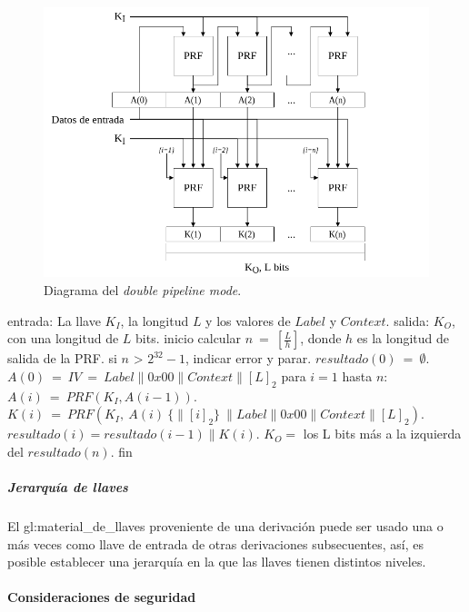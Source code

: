 \begin{figure}[H]
  \begin{center}
    \includegraphics[width=0.75\linewidth]{diagramas/dpipeline_mode}
    \caption{Diagrama del \textit{double pipeline mode}.}
    \label{diagrama_dpipeline_mode}
   \end{center}
\end{figure}

\begin{pseudocodigo}[caption={Funcionamiento del \textit{double pipeline mode}.}, 
label={mi:3}]
  entrada:   La llave $K_I$, la longitud $L$ y los valores de $Label$ y $Context$.
  salida:    $K_O$, con una longitud de $L$ bits.
  inicio
    calcular $n\: =\: [\frac{L}{h}]$, donde $h$ es la longitud de salida de la PRF.
    si $n$ > $2^{32}-1$, indicar error y parar.
    $resultado(0)\: =\: \emptyset$.
    $A(0)\: =\: IV\: =\: Label \parallel 0x00 \parallel Context \parallel {[L]}_2$
    para $i=1$ hasta $n$:
      $A(i)\: =\: PRF(K_I, A(i-1))$.
      $K(i)\: =\: PRF(K_I,\: A(i)\: \{\parallel {[i]}_2\}\: \parallel Label \parallel 0x00 \parallel Context \parallel {[L]}_2)$.
      $resultado(i) = resultado(i-1) \parallel K(i)$.
    $K_O =$ los L bits más a la izquierda del $resultado(n)$. 
  fin
\end{pseudocodigo}

\subparagraph{Jerarquía de llaves}
El \gls{gl:material_de_llaves} proveniente de una derivación puede ser usado 
una o más veces como llave de entrada de otras derivaciones subsecuentes, así, 
es posible establecer una jerarquía en la que las llaves tienen distintos 
niveles.

\paragraph{Consideraciones de seguridad}

